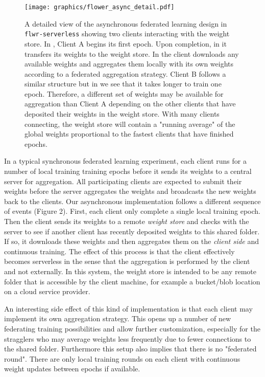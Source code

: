 \documentclass[twocolumn, switch]{article} %
\begin{document}
\begin{figure}
    \centering
    \texttt{[image: graphics/flower\_async\_detail.pdf]}
    \caption{A detailed view of the asynchronous federated learning design in \texttt{flwr-serverless} showing two clients interacting with the weight store. In , Client A begins its first epoch. Upon completion, in  it transfers its weights to the weight store. In  the client downloads any available weights and aggregates them locally with its own weights according to a federated aggregation strategy. Client B follows a similar structure but in  we see that it takes longer to train one epoch. Therefore, a different set of weights may be available for aggregation than Client A depending on the other clients that have deposited their weights in the weight store. With many clients connecting, the weight store will contain a "running average" of the global weights proportional to the fastest clients that have finished epochs.}
    \label{fig:async-detail}
\end{figure}

In a typical synchronous federated learning experiment, each client runs for a number of local training training epochs before it sends its weights to a central server for aggregation. All participating clients are expected to submit their weights before the server aggregates the weights and broadcasts the new weights back to the clients. Our asynchronous implementation follows a different sequence of events (Figure 2). First, each client only complete a single local training epoch. Then the client sends its weights to a remote \textit{weight store} and checks with the server to see if another client has recently deposited weights to this shared folder. If so, it downloads these weights and then aggregates them on the \textit{client side} and continuous training. The effect of this process is that the client effectively becomes serverless in the sense that the aggregation is performed by the client and not externally. In this system, the weight store is intended to be any remote folder that is accessible by the client machine, for example a bucket/blob location on a cloud service provider.

An interesting side effect of this kind of implementation is that each client may implement its own aggregation strategy. This opens up a number of new federating training possibilities and allow further customization, especially for the stragglers who may average weights less frequently due to fewer connections to the shared folder. Furthermore this setup also implies that there is no "federated round". There are only local training rounds on each client with continuous weight updates between epochs if available. 
\end{document}
